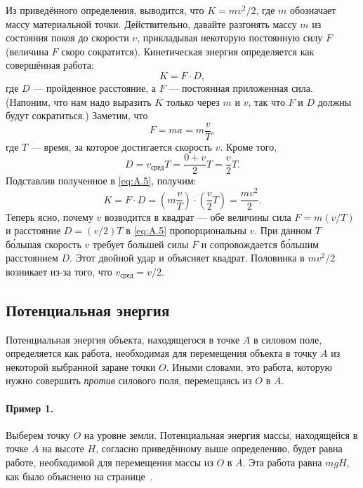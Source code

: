 Из приведённого определения, выводится, что $K=m v^2/2$, где $m$ обозначает массу материальной точки.
Действительно, давайте разгонять массу $m$ из состояния покоя до скорости $v$, прикладывая некоторую постоянную силу $F$ (величина $F$ скоро сократится).
Кинетическая энергия определяется как совершённая работа:
\begin{equation}
    K=F \cdot D,
    \label{eq:A.5}
\end{equation}
где $D$ --- пройденное расстояние, а $F$ --- постоянная приложенная сила.
(Напоним, что нам надо выразить $K$ только через $m$ и $v$,
так что $F$ и $D$ должны будут сократиться.)
Заметим, что
\[F=ma=m \frac{v}{T},\]
где $T$ --- время, за которое достигается скорость $v$.
Кроме того,
\[D=v_{\text{сред}} T=\frac{0+v}2  T=\frac{v}2 T.\]
Подставлив полученное в \eqref{eq:A.5}, получим:
\[K=F \cdot D= \left(m \frac{v}{T}\right) \cdot\left(\frac{v}2 T\right)= \frac{m v^2}2 .\]
Теперь ясно, почему $v$ возводится в квадрат --- обе величины сила $F=m(v/T)$ и расстояние $D=(v/2)T$ в \eqref{eq:A.5} пропорциональны $v$.
При данном $T$ б\'{о}льшая скорость $v$ требует большей силы $F$ и сопровождается б\'{о}льшим расстоянием $D$.
Этот двойной удар и объясняет квадрат.
Половинка в $mv^2/2$ возникает из-за того, что $v_{\text{сред}}=v/2$.

\subsection{Потенциальная энергия}

Потенциальная энергия объекта, находящегося в точке $A$ в силовом поле, определяется как работа, необходимая для перемещения объекта в точку $A$ из некоторой выбранной заране точки $O$.
Иными словами, это работа, которую нужно совершить \emph{против} силового поля, перемещаясь из $O$ в $A$.

\paragraph{Пример 1.}
Выберем точку $O$ на уровне земли.
Потенциальная энергия массы, находящейся в точке $A$ на высоте $H$,
согласно приведённому выше определению, будет равна работе,
необходимой для перемещения массы из $O$ в $A$.
Эта работа равна $mgH$, как было объяснено на странице~\pageref{Работа:Пример}.

